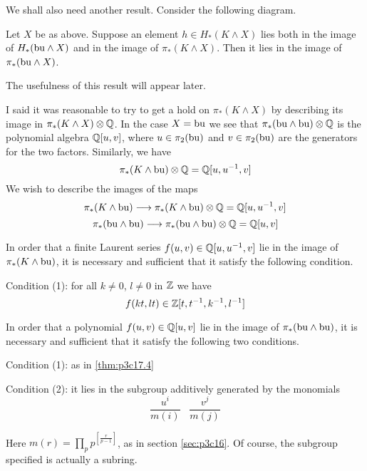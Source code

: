 \documentclass[../main]{subfiles}
\begin{document}
We shall also need another result. Consider the following diagram.


\begin{theorem} \label{thm:p3c17.3}
Let $X$ be as above. Suppose an element $h\in H_*(K\wedge X)$ lies both in the image of $H_*(\mathrm{bu}\wedge X)$ and in the image of $\pi_*(K\wedge X)$. Then it lies in the image of $\pi_*(\mathrm{bu}\wedge X)$.
\end{theorem}
The usefulness of this result will appear later.

I said it was reasonable to try to get a hold on $\pi_*(K\wedge X)$ by
describing its image in $\pi_*(K\wedge X)\otimes\mathbb{Q}$. In the case $X=\mathrm{bu}$ we see that $\pi_*(\mathrm{bu}\wedge\mathrm{bu})\otimes\mathbb{Q}$ is the polynomial algebra $\mathbb{Q}[u,v]$, where $u\in\pi_2(\mathrm{bu})$ and $v\in\pi_2(\mathrm{bu})$ are the generators for the two factors. Similarly, we have
\[
\pi_*(K\wedge\mathrm{bu})\otimes\mathbb{Q} = \mathbb{Q}[u,u^{-1},v]
\]
We wish to describe the images of the maps
\[
\pi_*(K\wedge\mathrm{bu}) \longrightarrow{} \pi_*(K\wedge\mathrm{bu})\otimes\mathbb{Q} = \mathbb{Q}[u,u^{-1},v]
\]
\[
\pi_*(\mathrm{bu}\wedge\mathrm{bu}) \longrightarrow{} \pi_*(\mathrm{bu}\wedge\mathrm{bu})\otimes\mathbb{Q} = \mathbb{Q}[u,v]
\]

\begin{theorem} \label{thm:p3c17.4}
In order that a finite Laurent series $f(u,v)\in\mathbb{Q}[u,u^{-1},v]$ lie in the image of $\pi_*(K\wedge\mathrm{bu})$, it is necessary and sufficient that it satisfy the following condition.

Condition (1): for all $k\ne0$, $l\ne0$ in $\mathbb{Z}$ we have
\[
f(kt,lt)\in\mathbb{Z}[t,t^{-1},k^{-1},l^{-1}]
\]
\end{theorem}

\begin{theorem} \label{thm:p3c17.5}
In order that a polynomial $f(u,v)\in\mathbb{Q}[u,v]$ lie in the image of $\pi_*(\mathrm{bu}\wedge\mathrm{bu})$, it is necessary and sufficient that it satisfy the following two conditions.

Condition (1): as in \ref{thm:p3c17.4}

Condition (2): it lies in the subgroup additively generated by
the monomials
\[
\frac{u^i}{m(i)}\;\;\;\frac{v^j}{m(j)}
\]
\end{theorem}
Here $m(r)=\prod_p p^{\left[\frac{r}{p-1}\right]}$, as in section \ref{sec:p3c16}. Of course, the subgroup specified is actually a subring.
\end{document}
